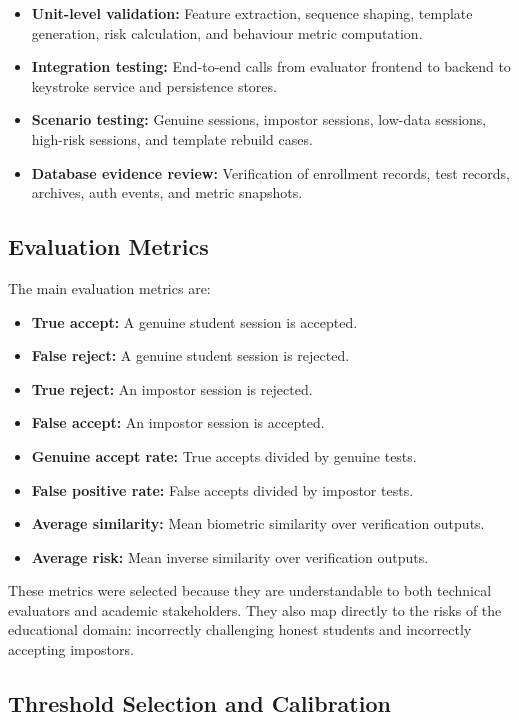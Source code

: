 \begin{itemize}
  \item \textbf{Unit-level validation:} Feature extraction, sequence shaping, template generation, risk calculation, and behaviour metric computation.
  \item \textbf{Integration testing:} End-to-end calls from evaluator frontend to backend to keystroke service and persistence stores.
  \item \textbf{Scenario testing:} Genuine sessions, impostor sessions, low-data sessions, high-risk sessions, and template rebuild cases.
  \item \textbf{Database evidence review:} Verification of enrollment records, test records, archives, auth events, and metric snapshots.
\end{itemize}

\subsection{Evaluation Metrics}
\label{subsec:evaluation-metrics}

The main evaluation metrics are:

\begin{itemize}
  \item \textbf{True accept:} A genuine student session is accepted.
  \item \textbf{False reject:} A genuine student session is rejected.
  \item \textbf{True reject:} An impostor session is rejected.
  \item \textbf{False accept:} An impostor session is accepted.
  \item \textbf{Genuine accept rate:} True accepts divided by genuine tests.
  \item \textbf{False positive rate:} False accepts divided by impostor tests.
  \item \textbf{Average similarity:} Mean biometric similarity over verification outputs.
  \item \textbf{Average risk:} Mean inverse similarity over verification outputs.
\end{itemize}

These metrics were selected because they are understandable to both technical evaluators and academic stakeholders. They also map directly to the risks of the educational domain: incorrectly challenging honest students and incorrectly accepting impostors.

\subsection{Threshold Selection and Calibration}
\label{subsec:threshold-calibration}

